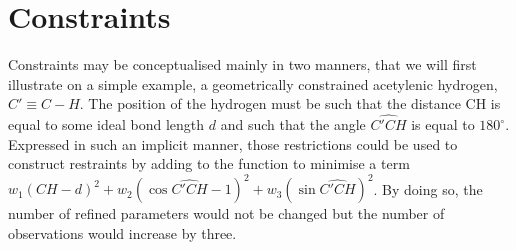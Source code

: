 \documentclass[pdf]{iucr}
\begin{document}
\section{Constraints}
\label{sec:constraints}

Constraints may be conceptualised mainly in two manners, that we will first illustrate on a simple example, a geometrically constrained acetylenic hydrogen, $C' \equiv C - H$. The position of the hydrogen must be such that the distance CH is equal to some ideal bond length $d$ and such that the angle $\widehat{C'CH}$ is equal to $180^\circ$. Expressed in such an implicit manner, those restrictions could be used to construct restraints by adding to the function to minimise a term $w_1 (CH - d)^2 + w_2 (\cos \widehat{C'CH} - 1)^2 + w_3 (\sin  \widehat{C'CH})^2$. By doing so, the number of refined parameters would not be changed but the number of observations would increase by three. 
\end{document}
